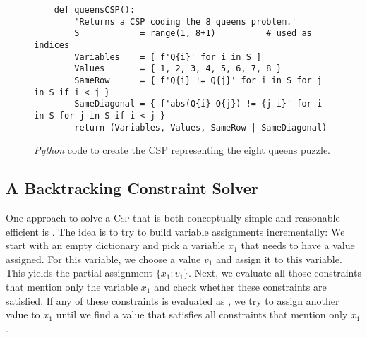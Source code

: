 \begin{figure}[!ht]
\centering
\begin{verbatim}
    def queensCSP():
        'Returns a CSP coding the 8 queens problem.'
        S            = range(1, 8+1)          # used as indices
        Variables    = [ f'Q{i}' for i in S ]
        Values       = { 1, 2, 3, 4, 5, 6, 7, 8 }
        SameRow      = { f'Q{i} != Q{j}' for i in S for j in S if i < j }
        SameDiagonal = { f'abs(Q{i}-Q{j}) != {j-i}' for i in S for j in S if i < j }
        return (Variables, Values, SameRow | SameDiagonal)
\end{verbatim}
\vspace*{-0.3cm}
\caption{\textsl{Python} code to create the CSP representing the eight queens puzzle.}
\label{fig:queens-csp.stlx}
\end{figure}


\subsection{A Backtracking Constraint Solver}
One approach to solve a \textsc{Csp} that is both conceptually simple and reasonable efficient is
.  The idea is to try to build variable assignments incrementally:  We start with
an empty dictionary and pick a variable $x_1$ that needs to have a value assigned.  For this variable, we
choose a value $v_1$ and assign it to this variable.  This yields the partial assignment $\{ x_1:v_1 \}$.
Next, we evaluate all those constraints that mention only the variable $x_1$ and check whether these constraints
are satisfied.  If any of these constraints is evaluated as , we try to assign another value to
$x_1$ until we find a value that satisfies all constraints that mention only $x_1$.

